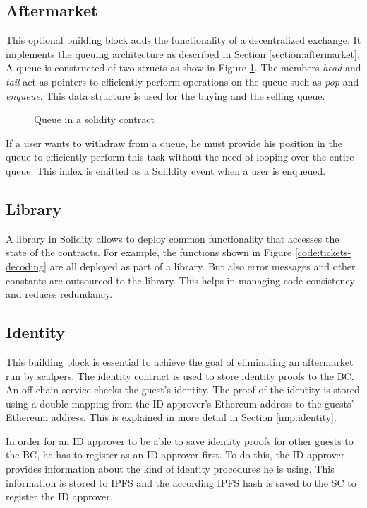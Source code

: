 \subsection{Aftermarket}
This optional building block adds the functionality of a decentralized exchange. It implements the queuing architecture as described in Section \ref{section:aftermarket}. A queue is constructed of two structs as show in Figure \ref{code:queue}. The members \textit{head} and \textit{tail} act as pointers to efficiently perform operations on the queue such as \textit{pop} and \textit{enqueue}. This data structure is used for the buying and the selling queue. 

\begin{figure}[hbt]
    
    \caption{Queue in a solidity contract}
    \label{code:queue}
\end{figure}

If a user wants to withdraw from a queue, he must provide his position in the queue to efficiently perform this task without the need of looping over the entire queue. This index is emitted as a Solildity event when a user is enqueued. 

\subsection{Library}
A library in Solidity allows to deploy common functionality that accesses the state of the contracts. For example, the functions shown in Figure \ref{code:tickets-decoding} are all deployed as part of a library. But also error messages and other constants are outsourced to the library. This helps in managing code consistency and reduces redundancy.

\subsection{Identity}
This building block is essential to achieve the goal of eliminating an aftermarket run by scalpers. The identity contract is used to store identity proofs to the BC. An off-chain service checks the guest's identity. The proof of the identity is stored using a double mapping from the ID approver's Ethereum address to the guests' Ethereum address. This is explained in more detail in Section \ref{imp:identity}.

In order for an ID approver to be able to save identity proofs for other guests to the BC, he has to register as an ID approver first. To do this, the ID approver provides information about the kind of identity procedures he is using. This information is stored to IPFS and the according IPFS hash is saved to the SC to register the ID approver.

